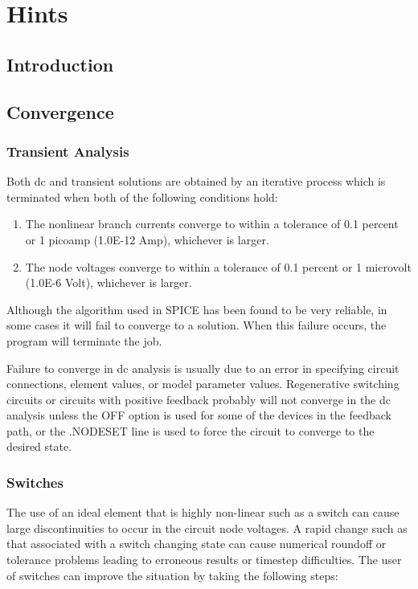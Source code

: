 \chapter{Hints}
\section{Introduction}
\section{Convergence}

\subsection{Transient Analysis}

Both dc and transient  solutions  are  obtained  by  an
iterative  process which is terminated when both of the following conditions
 hold:\\
\begin{enumerate}
\item The nonlinear branch  currents  converge  to  within  a
tolerance  of  0.1  percent or 1 picoamp (1.0E-12 Amp),
whichever is larger.

\item The node voltages converge to within a tolerance of 0.1
percent  or  1  microvolt  (1.0E-6  Volt), whichever is
larger.
\end{enumerate}

Although the algorithm used in SPICE has been found  to
be  very reliable, in some cases it will fail to converge to
a solution.  When this failure occurs, the program will terminate the job.

Failure to converge in dc analysis is usually due to an
error  in specifying circuit connections, element values, or
model parameter values.  Regenerative switching circuits  or
circuits  with  positive feedback probably will not converge
in the dc analysis unless the OFF option is used for some of
the  devices  in  the feedback path, or the .NODESET line is
used to force the circuit to converge to the desired state.

\subsection{Switches}
The use of an ideal element that is  highly  non-linear
such as a switch can cause large discontinuities to occur in
the circuit node voltages.  A  rapid  change  such  as  that
associated  with a switch changing state can cause numerical
roundoff or tolerance problems leading to erroneous  results
or  timestep difficulties.  The user of switches can improve
the situation by taking the following steps:

